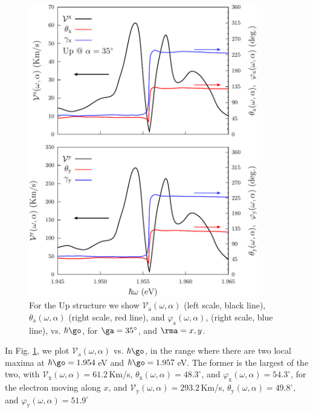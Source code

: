 \documentclass[floatfix,prb,aps,superscriptaddress,showpacs,11pt,preprint,letterpaper]{revtex4}
\def\tama{10cm}
\begin{document}
\begin{figure}[t]
\centering
\includegraphics[width=\tama]{upplots/up-vx-vy-w2}
\caption{For the Up structure we show $\mathcal{V}_{\mathrm{a}}
(\omega,\alpha)$ (left scale, black line), $\theta_{\mathrm{a}}
(\omega,\alpha)$ (right scale, red line), and $\varphi_{\mathrm{a}}
(\omega,\alpha)$, (right scale, blue line), vs. $\hbar\go$, for
$\ga=35^\circ$, and $\rma=x,y$. }
\label{fig:up-vx-vy-w2}
\end{figure}
In Fig. \ref{fig:up-vx-vy-w2}, we plot $\mathcal{V}_{\mathrm{a}}
(\omega,\alpha)$ vs. $\hbar\go$, in the range where there are two local maxima
at $\hbar\go=1.954$\,eV and $\hbar\go=1.957$\,eV.
% 
The former is the largest of the two, with
$\mathcal{V}_{\mathrm{x}} (\omega,\alpha)=61.2$\,Km/s,
$\theta_{\mathrm{x}} (\omega,\alpha)=48.3^{\circ}$, and 
$\varphi_{\mathrm{x}} (\omega,\alpha)=54.3^{\circ}$,
for the electron moving along $x$, and
$\mathcal{V}_{\mathrm{y}} (\omega,\alpha)=293.2$\,Km/s,
$\theta_{\mathrm{y}} (\omega,\alpha)=49.8^{\circ}$, and 
$\varphi_{\mathrm{y}} (\omega,\alpha)=51.9^{\circ}$
\end{document}
